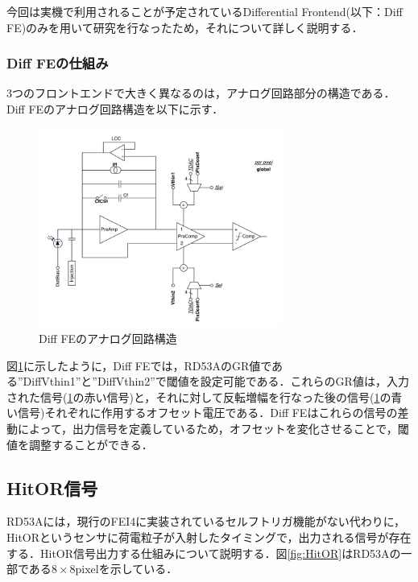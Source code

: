 今回は実機で利用されることが予定されているDifferential Frontend(以下：Diff FE)のみを用いて研究を行なったため，それについて詳しく説明する．

\subsubsection*{Diff FEの仕組み}
3つのフロントエンドで大きく異なるのは，アナログ回路部分の構造である．Diff FEのアナログ回路構造を以下に示す．\\

\begin{figure}[h]
\centering
\includegraphics[width=8cm]{./figure/RD53A_DiffFE.png}
\caption{Diff FEのアナログ回路構造}
\label{fig:DiffFE}
\end{figure}

図\ref{fig:DiffFE}に示したように，Diff FEでは，RD53AのGR値である''DiffVthin1''と''DiffVthin2''で閾値を設定可能である．これらのGR値は，入力された信号(\ref{fig:DiffFE}の赤い信号)と，それに対して反転増幅を行なった後の信号(\ref{fig:DiffFE}の青い信号)それぞれに作用するオフセット電圧である．Diff FEはこれらの信号の差動によって，出力信号を定義しているため，オフセットを変化させることで，閾値を調整することができる．



\subsection{HitOR信号}
RD53Aには，現行のFEI4に実装されているセルフトリガ機能がない代わりに，HitORというセンサに荷電粒子が入射したタイミングで，出力される信号が存在する．HitOR信号出力する仕組みについて説明する．図\ref{fig:HitOR}はRD53Aの一部である$8 \times 8 \mathrm{pixel}$を示している．

